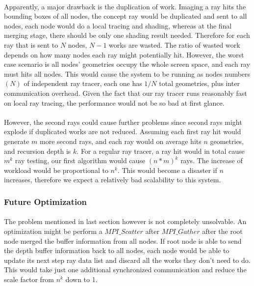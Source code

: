 \documentclass[a4paper, oneside, 10pt]{article}
\begin{document}
\paragraph{} Apparently, a major drawback is the duplication of work. Imaging a ray hits the bounding boxes of all nodes, the concept ray would be duplicated and sent to all nodes, each node would do a local tracing and shading, whereas at the final merging stage, there should be only one shading result needed. Therefore for each ray that is sent to $N$ nodes, $N-1$ works are wasted. The ratio of wasted work depends on how many nodes each ray might potentially hit. However, the worst case scenario is all nodes' geometries occupy the whole screen space, and each ray must hits all nodes. This would cause the system to be running as nodes numbers $(N)$ of independent ray tracer, each one has $1/N$ total geometries, plus inter communication overhead. Given the fact that our ray tracer runs reasonably fast on local ray tracing, the performance would not be so bad at first glance.
\paragraph{}However, the second rays could cause further problems since second rays might explode if duplicated works are not reduced. Assuming each first ray hit would generate $m$ more second rays, and each ray would on average hits $n$ geometries, and recursion depth is $k$. For a regular ray tracer, a ray hit would in total cause $m^k$ ray testing, our first algorithm would cause $(n*m)^k$ rays. The increase of workload would be proportional to $n^k$. This would become a disaster if $n$ increases, therefore we expect a relatively bad scalability to this system.
\subsubsection{Future Optimization}
\paragraph{}The problem mentioned in last section however is not completely unsolvable. An optimization might be perform a $MPI\_Scatter$ after $MPI\_Gather$ after the root node merged the buffer information from all nodes. If root node is able to send the depth buffer information back to all nodes, each node would be able to update its next step ray data list and discard all the works they don't need to do. This would take just one additional synchronized communication and reduce the scale factor from $n^k$ down to 1.
\end{document}
